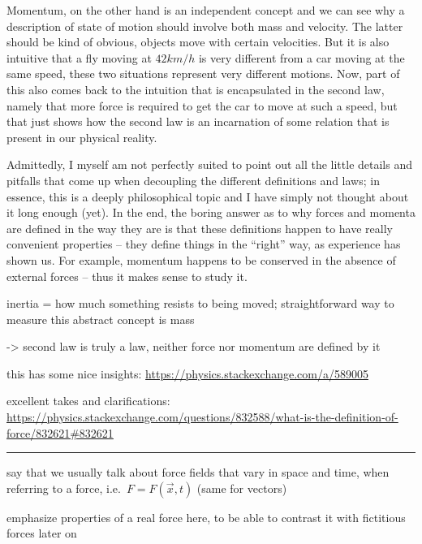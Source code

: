 \documentclass[../class_mech_main.tex]{subfiles}
\begin{document}
Momentum, on the other hand is an independent concept and we can see why a description of state of motion should involve both mass and velocity. The latter should be kind of obvious, objects move with certain velocities. But it is also intuitive that a fly moving at $42 km/h$ is very different from a car moving at the same speed, these two situations represent very different motions.
Now, part of this also comes back to the intuition that is encapsulated in the second law, namely that more force is required to get the car to move at such a speed, but that just shows how the second law is an incarnation of some relation that is present in our physical reality. 


Admittedly, I myself am not perfectly suited to point out all the little details and pitfalls that come up when decoupling the different definitions and laws; in essence, this is a deeply philosophical topic and I have simply not thought about it long enough (yet). In the end, the boring answer as to why forces and momenta are defined in the way they are is that these definitions happen to have really convenient properties -- they define things in the \enquote{right} way, as experience has shown us. For example, momentum happens to be conserved in the absence of external forces -- thus it makes sense to study it.


inertia = how much something resists to being moved; straightforward way to measure this abstract concept is mass


-> second law is truly a law, neither force nor momentum are defined by it


this has some nice insights: \url{https://physics.stackexchange.com/a/589005}


excellent takes and clarifications: \url{https://physics.stackexchange.com/questions/832588/what-is-the-definition-of-force/832621#832621}


\hrule



say that we usually talk about force fields that vary in space and time, when referring to a force, i.e.~$F = F(\vec{x}, t)$ (same for vectors)

emphasize properties of a real force here, to be able to contrast it with fictitious forces later on
\end{document}
